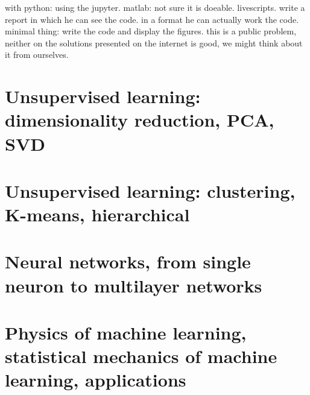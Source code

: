\documentclass[a4paper]{tufte-book}
\begin{document}
with python: using the jupyter.
matlab: not sure it is doeable. livescripts.
write a report in which he can see the code. in a format he can actually work
the code.
minimal thing: write the code and display the figures.
this is a public problem, neither on the solutions presented on the internet is
good, we might think about it from ourselves.





\chapter{Unsupervised learning: dimensionality reduction, PCA, SVD}
\label{ch:unsupervised-1}
\chapter{Unsupervised learning: clustering, K-means, hierarchical}
\label{ch:unsupervised-2}

\chapter{Neural networks, from single neuron to multilayer networks}
\label{ch:neural-networks}

\chapter{Physics of machine learning, statistical mechanics of machine learning, applications}
\label{ch:physics}
\end{document}
